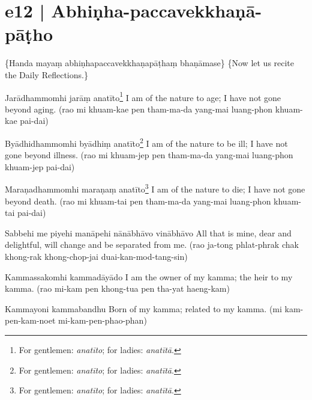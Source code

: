 \section*{e12 | Abhiṇha-paccavekkhaṇā-pāṭho}\label{sec:e12}

\begin{chantsubsection}
  \chantnote
    {\{Handa mayaṃ abhiṇhapaccavekkhaṇapāṭhaṃ bhaṇāmase\}}
  \chantnotetrans
    {\{Now let us recite the Daily Reflections.\}}

  \chantgap

  \chantnote
    {Jarādhammomhi jarāṃ anatīto\footnote{For gentlemen: \textit{anatīto}; for ladies: \textit{anatītā}.}}
  \chantnote
    {I am of the nature to age; I have not gone beyond aging.}
  \chantindent
    {(rao mi khuam-kae pen tham-ma-da yang-mai luang-phon khuam-kae pai-dai)}

  \chantgap

  \chantnote
    {Byādhidhammomhi byādhiṃ anatīto\footnote{For gentlemen: \textit{anatīto}; for ladies: \textit{anatītā}.}}
  \chantnote
    {I am of the nature to be ill; I have not gone beyond illness.}
  \chantindent
    {(rao mi khuam-jep pen tham-ma-da yang-mai luang-phon khuam-jep pai-dai)}

  \chantgap

  \chantnote
    {Maraṇadhammomhi maraṇaṃ anatīto\footnote{For gentlemen: \textit{anatīto}; for ladies: \textit{anatītā}.}}
  \chantnote
    {I am of the nature to die; I have not gone beyond death.}
  \chantindent
    {(rao mi khuam-tai pen tham-ma-da yang-mai luang-phon khuam-tai pai-dai)}

  \chantgap

  \chantnote
    {Sabbehi me piyehi manāpehi nānābhāvo vinābhāvo}
  \chantnote
    {All that is mine, dear and delightful, will change and be separated from me.}
  \chantindent
    {(rao ja-tong phlat-phrak chak khong-rak khong-chop-jai duai-kan-mod-tang-sin)}

  \chantgap

  \chantnote
    {Kammassakomhi kammadāyādo}
  \chantnote
    {I am the owner of my kamma; the heir to my kamma.}
  \chantindent
    {(rao mi-kam pen khong-tua pen tha-yat haeng-kam)}

  \chantgap

  \chantnote
    {Kammayoni kammabandhu}
  \chantnote
    {Born of my kamma; related to my kamma.}
  \chantindent
    {(mi kam-pen-kam-noet mi-kam-pen-phao-phan)}


\end{chantsubsection}
